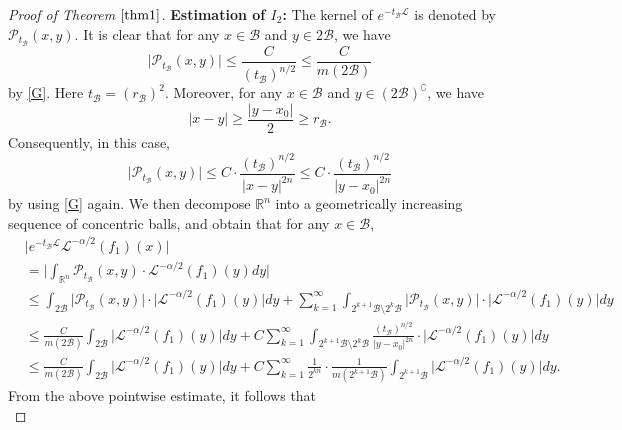 \documentclass[10pt, reqno]{amsart}
\theoremstyle{definition}
\theoremstyle{remark}
\numberwithin{equation}{section}
\begin{document}
\begin{proof}[Proof of Theorem $\ref{thm1}$]
\textbf{Estimation of $I_2$:} The kernel of $e^{-t_{\mathcal{B}}\mathcal{L}}$ is denoted by $\mathcal{P}_{t_{\mathcal{B}}}(x,y)$. It is clear that for any $x\in \mathcal{B}$ and $y\in 2\mathcal{B}$, we have
\begin{equation*}
\big|\mathcal{P}_{t_{\mathcal{B}}}(x,y)\big|\leq\frac{C}{(t_{\mathcal{B}})^{n/2}}\leq\frac{C}{m(2\mathcal{B})}
\end{equation*}
by \eqref{G}. Here $t_{\mathcal{B}}=(r_{\mathcal{B}})^2$. Moreover, for any $x\in \mathcal{B}$ and $y\in(2\mathcal{B})^{\complement}$, we have
\begin{equation*}
|x-y|\geq\frac{|y-x_0|}{2}\geq r_{\mathcal{B}}.
\end{equation*}
Consequently, in this case,
\begin{equation*}
\big|\mathcal{P}_{t_{\mathcal{B}}}(x,y)\big|\leq C\cdot\frac{(t_{\mathcal{B}})^{n/2}}{|x-y|^{2n}}
\leq C\cdot\frac{(t_{\mathcal{B}})^{n/2}}{|y-x_0|^{2n}}
\end{equation*}
by using \eqref{G} again.
We then decompose $\mathbb R^n$ into a geometrically increasing sequence of concentric balls, and obtain that for any $x\in \mathcal{B}$,
\begin{equation*}
\begin{split}
&\big|e^{-t_{\mathcal{B}}\mathcal{L}}\mathcal{L}^{-\alpha/2}(f_1)(x)\big|\\
&=\bigg|\int_{\mathbb R^n}\mathcal{P}_{t_{\mathcal{B}}}(x,y)\cdot\mathcal{L}^{-\alpha/2}(f_1)(y)dy\bigg|\\
&\leq \int_{2\mathcal{B}}\big|\mathcal{P}_{t_{\mathcal{B}}}(x,y)\big|\cdot\big|\mathcal{L}^{-\alpha/2}(f_1)(y)\big|dy
+\sum_{k=1}^{\infty}\int_{2^{k+1}\mathcal{B}\setminus 2^k \mathcal{B}}\big|\mathcal{P}_{t_{\mathcal{B}}}(x,y)\big|\cdot\big|\mathcal{L}^{-\alpha/2}(f_1)(y)\big|dy\\
&\leq\frac{C}{m(2\mathcal{B})}\int_{2\mathcal{B}}\big|\mathcal{L}^{-\alpha/2}(f_1)(y)\big|dy
+C\sum_{k=1}^{\infty}\int_{2^{k+1}\mathcal{B}\setminus 2^k \mathcal{B}}\frac{(t_{\mathcal{B}})^{n/2}}{|y-x_0|^{2n}}\cdot\big|\mathcal{L}^{-\alpha/2}(f_1)(y)\big|dy\\
&\leq\frac{C}{m(2\mathcal{B})}\int_{2\mathcal{B}}\big|\mathcal{L}^{-\alpha/2}(f_1)(y)\big|dy
+C\sum_{k=1}^{\infty}\frac{1}{2^{kn}}\cdot\frac{1}{m(2^{k+1}\mathcal{B})}\int_{2^{k+1}\mathcal{B}}\big|\mathcal{L}^{-\alpha/2}(f_1)(y)\big|dy.
\end{split}
\end{equation*}
From the above pointwise estimate, it follows that
\begin{equation*}

\end{equation*}
\end{proof}
\end{document}
